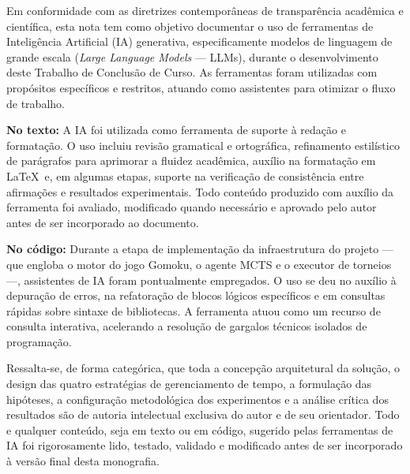 \documentclass[cic,tc]{iiufrgs}
\begin{document}
Em conformidade com as diretrizes contemporâneas de transparência acadêmica e científica, esta nota tem como objetivo documentar o uso de ferramentas de Inteligência Artificial (IA) generativa, especificamente modelos de linguagem de grande escala (\emph{Large Language Models} --- LLMs), durante o desenvolvimento deste Trabalho de Conclusão de Curso. As ferramentas foram utilizadas com propósitos específicos e restritos, atuando como assistentes para otimizar o fluxo de trabalho.

\textbf{No texto:} A IA foi utilizada como ferramenta de suporte à redação e formatação. O uso incluiu revisão gramatical e ortográfica, refinamento estilístico de parágrafos para aprimorar a fluidez acadêmica, auxílio na formatação em \LaTeX\ e, em algumas etapas, suporte na verificação de consistência entre afirmações e resultados experimentais. Todo conteúdo produzido com auxílio da ferramenta foi avaliado, modificado quando necessário e aprovado pelo autor antes de ser incorporado ao documento.

\textbf{No código:} Durante a etapa de implementação da infraestrutura do projeto — que engloba o motor do jogo Gomoku, o agente MCTS e o executor de torneios —, assistentes de IA foram pontualmente empregados. O uso se deu no auxílio à depuração de erros, na refatoração de blocos lógicos específicos e em consultas rápidas sobre sintaxe de bibliotecas. A ferramenta atuou como um recurso de consulta interativa, acelerando a resolução de gargalos técnicos isolados de programação.

Ressalta-se, de forma categórica, que toda a concepção arquitetural da solução, o design das quatro estratégias de gerenciamento de tempo, a formulação das hipóteses, a configuração metodológica dos experimentos e a análise crítica dos resultados são de autoria intelectual exclusiva do autor e de seu orientador. Todo e qualquer conteúdo, seja em texto ou em código, sugerido pelas ferramentas de IA foi rigorosamente lido, testado, validado e modificado antes de ser incorporado à versão final desta monografia.
\end{document}
